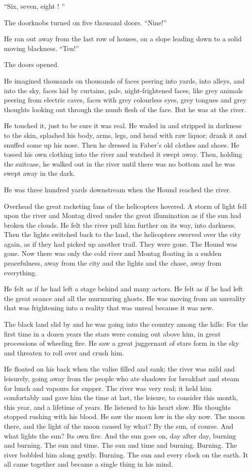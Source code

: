\documentclass[11pt,openany]{book}
\begin{document}
``Six, seven, eight ! ''

The doorknobs turned on five thousand doors. ``Nine!''

He ran out away from the last row of houses, on a slope leading down to a solid moving blackness. ``Ten!''

The doors opened.

He imagined thousands on thousands of faces peering into yards, into alleys, and into the sky, faces hid by curtains, pale, night-frightened faces, like grey animals peering from electric caves, faces with grey colourless eyes, grey tongues and grey thoughts looking out through the numb flesh of the face. But he was at the river.

He touched it, just to be sure it was real. He waded in and stripped in darkness to the skin, splashed his body, arms, legs, and head with raw liquor; drank it and snuffed some up his nose. Then he dressed in Faber's old clothes and shoes. He tossed his own clothing into the river and watched it swept away. Then, holding the suitcase, he walked out in the river until there was no bottom and he was swept away in the dark.

He was three hundred yards downstream when the Hound reached the river.

Overhead the great racketing fans of the helicopters hovered. A storm of light fell upon the river and Montag dived under the great illumination as if the sun had broken the clouds. He felt the river pull him further on its way, into darkness. Then the lights switched back to the land, the helicopters swerved over the city again, as if they had picked up another trail. They were gone. The Hound was gone. Now there was only the cold river and Montag floating in a sudden peacefulness, away from the city and the lights and the chase, away from everything.

He felt as if he had left a stage behind and many actors. He felt as if he had left the great seance and all the murmuring ghosts. He was moving from an unreality that was frightening into a reality that was unreal because it was new.

The black land slid by and he was going into the country among the hills: For the first time in a dozen years the stars were coming out above him, in great processions of wheeling fire. He saw a great juggernaut of stars form in the sky and threaten to roll over and crush him.

He floated on his back when the valise filled and sank; the river was mild and leisurely, going away from the people who ate shadows for breakfast and steam for lunch and vapours for supper. The river was very real; it held him comfortably and gave him the time at last, the leisure, to consider this month, this year, and a lifetime of years. He listened to his heart slow. His thoughts stopped rushing with his blood. He saw the moon low in the sky now. The moon there, and the light of the moon caused by what? By the sun, of course. And what lights the sun? Its own fire. And the sun goes on, day after day, burning and burning. The sun and time. The sun and time and burning. Burning. The river bobbled him along gently. Burning. The sun and every clock on the earth. It all came together and became a single thing in his mind.
\end{document}
